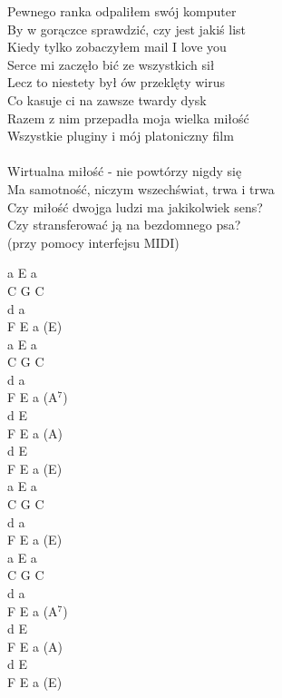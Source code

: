 \documentclass[a5paper, 10pt]{book}
\begin{document}
\begin{minipage}[t]{0.8\textwidth}
Pewnego ranka odpaliłem swój komputer\\
By w gorączce sprawdzić, czy jest jakiś list\\
Kiedy tylko zobaczyłem mail I love you\\
Serce mi zaczęło bić ze wszystkich sił\\
Lecz to niestety był ów przeklęty wirus\\
Co kasuje ci na zawsze twardy dysk\\
Razem z nim przepadła moja wielka miłość\\
Wszystkie pluginy i mój platoniczny film\\
\\
\hspace*{5mm}Wirtualna miłość - nie powtórzy nigdy się\\
\hspace*{5mm}Ma samotność, niczym wszechświat, trwa i trwa\\
\hspace*{5mm}Czy miłość dwojga ludzi ma jakikolwiek sens?\\
\hspace*{5mm}Czy stransferować ją na bezdomnego psa?\\
\hspace*{5mm}(przy pomocy interfejsu MIDI)

\end{minipage}
\begin{minipage}[t]{0.2\textwidth}
a E a\\
C G C\\
d a\\
F E a (E)\\
a E a\\
C G C\\
d a\\
F E a (A$^7$)\\

d E\\
F E a (A)\\
d E\\
F E a (E)\\

a E a\\
C G C\\
d a\\
F E a (E)\\
a E a\\
C G C\\
d a\\
F E a (A$^7$)\\

d E\\
F E a (A)\\
d E\\
F E a (E)\\
\end{minipage}
\end{document}
